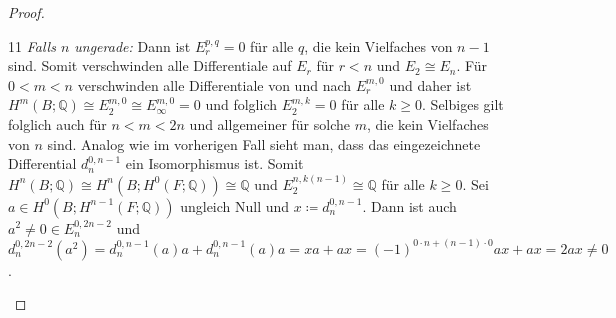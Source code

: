 \documentclass[11pt, a4paper, german]{article}
\theoremstyle{definition}
\theoremstyle{remark}
\newcommand{\Q}{\mathbb{Q}} %
\newcommand{\zeroDot}[2]{\node[draw,circle,inner sep=0.4pt,fill] at (#1,#2) {};} %
\begin{document}
\begin{proof}
  \renewcommand\windowpagestuff{
    \begin{center}\begin{tikzpicture}[x=16pt,y=16pt]\begin{scope}[shift={(0,0)}]
      \foreach \x in {1,2,3}{
        \foreach \y in {0,1,...,6}{
          \zeroDot{\x}{\y}
        }
      }
      \foreach \y in {0,...,6}{
        \zeroDot{5}{\y}
      }
      \foreach \x in {0,...,5}{
        \node at (\x,7.3) {\vdots};
      }
      \node at (0,0) {$\Q$\small $1$};
      \zeroDot{0}{1}
      \zeroDot{0}{2}
      \node at (0,3) {$\Q$\small $a$};
      \zeroDot{0}{4}
      \zeroDot{0}{5}
      \node at (0,6) {$\Q$\small $a^2$};
      \node at (4,0) {$\Q$\small $x$};
      \zeroDot{4}{1}
      \zeroDot{4}{2}
      \node at (4,3) {$\Q$\small $ax$};
      \zeroDot{4}{4}
      \zeroDot{4}{5}
      \node at (4,6) {$\Q$\small $a^2 x$};
      \draw[->,gray] (0.6,2.6) -- (3.4,0.4);
      \draw[->,gray] (0.6,5.6) -- (3.4,3.4);
      \draw[->] (-0.7,-0.6) -- (5.6,-0.6); %
      \draw[->] (-0.7,-0.6) -- (-0.7,7.8); %
      \node[left] at (-0.7,0) {$0$};
      \node[left] at (-0.9,1.7) {\vdots};
      \node[left] at (-0.7,3) {$n{-}1$};
      \node[left] at (-0.9,4.7) {\vdots};
      \node[left] at (-0.7,6) {$2n{-}2$};
      \node[below] at (0,-0.6) {$0$};
      \node[below] at (2,-0.7) {$\cdots$};
      \node[below] at (4,-0.7) {$n$};
    \end{scope}\end{tikzpicture}\end{center}
  }
  \opencutleft
  \begin{cutout}{0}{0pt}{\dimexpr\linewidth-5.5cm\relax}{11}
    \emph{Falls $n$ ungerade:} \enspace
    Dann ist $E_r^{p,q} = 0$ für alle $q$, die kein Vielfaches von $n-1$ sind.
    Somit verschwinden alle Differentiale auf $E_r$ für $r < n$ und $E_2 \cong E_n$.
    Für $0 < m < n$ verschwinden alle Differentiale von und nach $E_r^{m,0}$ und daher ist $H^m(B; \Q) \cong E_2^{m,0} \cong E_\infty^{m,0} = 0$ und  folglich $E_2^{m,k} = 0$ für alle $k \geq 0$.
    Selbiges gilt folglich auch für $n < m < 2n$ und allgemeiner für solche $m$, die kein Vielfaches von $n$ sind.
    Analog wie im vorherigen Fall sieht man, dass das eingezeichnete Differential $d_n^{0,n-1}$ ein Isomorphismus ist.
    Somit $H^n(B; \Q) \cong H^n(B; H^0(F; \Q)) \cong \Q$ und $E_2^{n,k(n-1)} \cong \Q$ für alle $k \geq 0$.
    Sei $a \in H^0(B; H^{n-1}(F; \Q))$ ungleich Null und $x \coloneqq d_n^{0,n-1}$.
    Dann ist auch $a^2 \neq 0 \in E_n^{0,2n-2}$ und $d_n^{0,2n-2}(a^2) = d_n^{0,n-1}(a)a + d_n^{0,n-1}(a)a = xa + ax = (-1)^{0 \cdot n + (n-1) \cdot 0} ax + ax = 2ax \neq 0$.

\end{cutout}
\end{proof}
\end{document}
